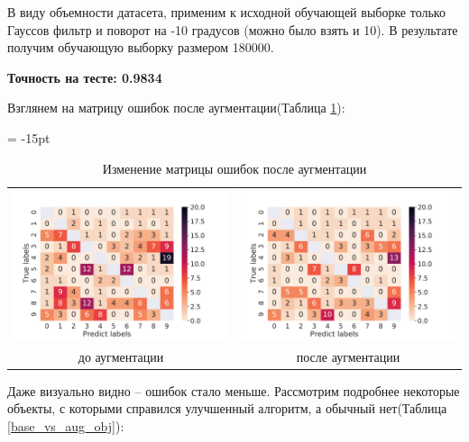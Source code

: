 \documentclass[12pt,fleqn]{article}
\begin{document}
В виду объемности датасета, применим к исходной обучающей выборке только Гауссов фильтр и поворот на -10 градусов (можно было взять и 10).
В результате получим обучающую выборку размером 180000.

\newpage
\textcolor{blue(ryb)}{\textbf{Точность на тесте: 0.9834}}

Взглянем на матрицу ошибок после аугментации(Таблица \ref{conf_matrix_aug}):

\begin{table}[htb]
    \centering
    \tabcolsep = -15pt
    \begin{tabular}{cc}
        \includegraphics[width=10cm]{task4.pdf} & \includegraphics[width=10cm]{task5_conf_mat.pdf}\\
        до аугментации & после аугментации 
    \end{tabular}
    \caption{Изменение матрицы ошибок после аугментации}
    \label{conf_matrix_aug}
\end{table}

Даже визуально видно -- ошибок стало меньше. Рассмотрим подробнее некоторые объекты, 
с которыми справился улучшенный алгоритм, а обычный нет(Таблица \ref{base_vs_aug_obj}):
\end{document}
